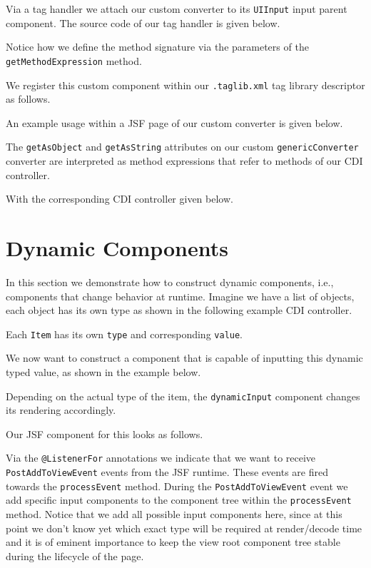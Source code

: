 Via a tag handler we attach our custom converter to its \texttt{UIInput} input parent component.
The source code of our tag handler is given below.

Notice how we define the method signature via the parameters of the \texttt{getMethodExpression} method.

We register this custom component within our \texttt{.taglib.xml} tag library descriptor as follows.


An example usage within a JSF page of our custom converter is given below.

The \texttt{getAsObject} and \texttt{getAsString} attributes on our custom \texttt{genericConverter} converter are interpreted as method expressions that refer to methods of our CDI controller.

With the corresponding CDI controller given below.



\section{Dynamic Components}
\label{sec:dynamic-components}
In this section we demonstrate how to construct dynamic components, i.e., components that change behavior at runtime.
Imagine we have a list of objects, each object has its own type as shown in the following example CDI controller.

Each \texttt{Item} has its own \texttt{type} and corresponding \texttt{value}.

We now want to construct a component that is capable of inputting this dynamic typed value, as shown in the example below.

Depending on the actual type of the item, the \texttt{dynamicInput} component changes its rendering accordingly.

Our JSF component for this looks as follows.

Via the \texttt{@ListenerFor} annotations we indicate that we want to receive \texttt{PostAddToViewEvent} events from the JSF runtime.
These events are fired towards the \texttt{processEvent} method.
During the \texttt{PostAddToViewEvent} event we add specific input components to the component tree within the \texttt{processEvent} method.
Notice that we add all possible input components here,  since at this point we don't know yet which exact type will be required at render/decode time and it is of eminent importance to keep the view root component tree stable during the lifecycle of the page.

